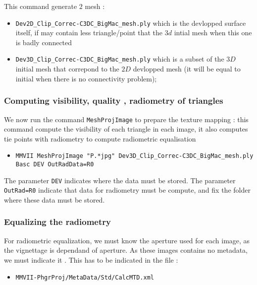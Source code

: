 This command generate $2$ mesh :

\begin{itemize}
	\item {\tt Dev2D\_Clip\_Correc-C3DC\_BigMac\_mesh.ply} which is the devlopped surface itself,
              if may contain less triangle/point that the $3d$ intial mesh when this one is badly connected 
		
	\item {\tt Dev3D\_Clip\_Correc-C3DC\_BigMac\_mesh.ply} which is a subset of the $3D$ initial mesh
		that correpond to the $2D$ devlopped mesh (it will be equal to initial when there is no connectivity problem);
\end{itemize}


\subsubsection{Computing visibility, quality , radiometry of triangles}

We now run the command  {\tt MeshProjImage} to prepare the texture mapping : this command
compute the visibility of each triangle in each image, it also computes tie points with 
radiometry to compute radiometric equalisation 

\begin{itemize}
    \item {\tt MMVII MeshProjImage "P.*jpg"  Dev3D\_Clip\_Correc-C3DC\_BigMac\_mesh.ply Basc DEV OutRadData=R0}
\end{itemize}

The parameter {\tt DEV} indicates where the data must be stored.
The parameter {\tt OutRad=R0} indicate that data for radiometry 
must be compute, and fix the folder where these data must be stored.


\subsubsection{Equalizing the radiometry}

For radiometric equalization, we must know the aperture used for each image,
as the vignettage is dependand of aperture. As these images contains no metadata,
we must indicate it . This has to be indicated in the file :

\begin{itemize}
    \item {\tt MMVII-PhgrProj/MetaData/Std/CalcMTD.xml}
\end{itemize}

